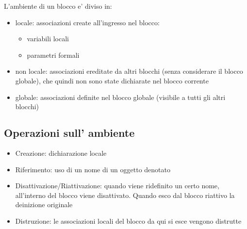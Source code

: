 L'ambiente di un blocco e' diviso in:
\begin{itemize}
\item locale: associazioni create all'ingresso nel blocco:
  \begin{itemize}
  \item variabili locali
  \item parametri formali
  \end{itemize}
\item non locale: associazioni ereditate da altri blocchi (senza considerare il blocco globale), che quindi non sono state dichiarate nel blocco corrente
\item globale: associazioni definite nel blocco globale (visibile a tutti gli altri blocchi)
\end{itemize}

\subsection{Operazioni sull' ambiente}
\begin{itemize}
\item Creazione: dichiarazione locale
\item Riferimento: uso di un nome di un oggetto denotato
\item Disattivazione/Riattivazione: quando viene ridefinito un certo nome, all'interno del blocco viene disattivato. Quando esco dal blocco riattivo la deinizione originale
\item Distruzione: le associazioni locali del blocco da qui si esce vengono distrutte
\end{itemize}



